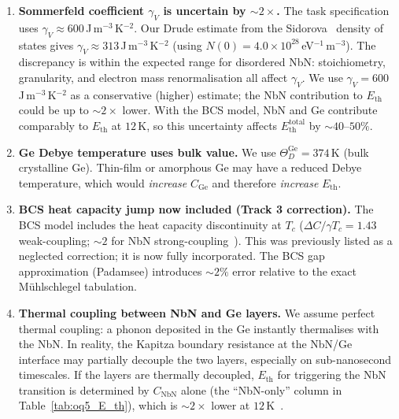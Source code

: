 \begin{enumerate}

\item \textbf{Sommerfeld coefficient $\gamma_V$ is uncertain by
  $\sim 2\times$.}
  The task specification uses $\gamma_V \approx 600$\,J\,m$^{-3}$\,K$^{-2}$.
  Our Drude estimate from the Sidorova~\cite{Sidorova2020} density of states %
  gives $\gamma_V \approx 313$\,J\,m$^{-3}$\,K$^{-2}$ (using
  $N(0) = 4.0 \times 10^{28}$\,eV$^{-1}$\,m$^{-3}$). The discrepancy
  is within the expected range for disordered NbN: stoichiometry,
  granularity, and electron mass renormalisation all affect $\gamma_V$.
  We use $\gamma_V = 600$\,J\,m$^{-3}$\,K$^{-2}$ as a conservative
  (higher) estimate; the NbN contribution to $E_\mathrm{th}$ could be up
  to $\sim 2\times$ lower. With the BCS model, NbN and Ge contribute
  comparably to $E_\mathrm{th}$ at $12$\,K, so this uncertainty
  affects $E_\mathrm{th}^\mathrm{total}$ by $\sim 40$--$50\%$.

\item \textbf{Ge Debye temperature uses bulk value.}
  We use $\Theta_D^\mathrm{Ge} = 374$\,K (bulk crystalline Ge).
  Thin-film or amorphous Ge may have a reduced Debye temperature,
  which would \emph{increase} $C_\mathrm{Ge}$ and therefore
  \emph{increase} $E_\mathrm{th}$.

\item \textbf{BCS heat capacity jump now included (Track 3 correction).}
  The BCS model includes the heat capacity discontinuity at $T_c$
  ($\Delta C / \gamma T_c = 1.43$ weak-coupling; $\sim\!2$ for
  NbN strong-coupling~\cite{Chockalingam2008}).
  This was previously listed as a neglected correction; it is now
  fully incorporated. The BCS gap approximation (Padamsee) introduces
  $\sim\!2\%$ error relative to the exact M\"uhlschlegel tabulation.

\item \textbf{Thermal coupling between NbN and Ge layers.}
  We assume perfect thermal coupling: a phonon deposited in the Ge
  instantly thermalises with the NbN. In reality, the Kapitza boundary
  resistance at the NbN/Ge interface may partially decouple the two
  layers, especially on sub-nanosecond timescales. If the layers are
  thermally decoupled, $E_\mathrm{th}$ for triggering the NbN transition
  is determined by $C_\mathrm{NbN}$ alone (the ``NbN-only'' column in
  Table~\ref{tab:oq5_E_th}), which is $\sim 2\times$ lower at
  $12$\,K~\cite{Richards1994}. %


\end{enumerate}
